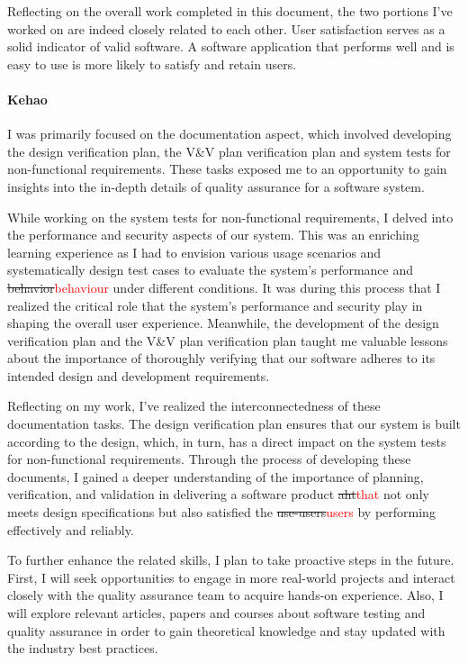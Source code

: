 \documentclass[12pt, titlepage]{article}
\newcommand{\rt}[1]{\textcolor{red}{#1}}
\begin{document}
Reflecting on the overall work completed in this document, the two portions I've
worked on are indeed closely related to each other. User satisfaction serves as
a solid indicator of valid software. A software application that performs well
and is easy to use is more likely to satisfy and retain users.

\paragraph*{Kehao}

I was primarily focused on the documentation aspect, which involved developing
the design verification plan, the V\&V plan verification plan and system tests
for non-functional requirements. These tasks exposed me to an opportunity to
gain insights into the in-depth details of quality assurance for a software
system.

While working on the system tests for non-functional requirements, I delved into
the performance and security aspects of our system. This was an enriching
learning experience as I had to envision various usage scenarios and
systematically design test cases to evaluate the system’s performance and
\sout{behavior}\rt{behaviour} under different conditions. It was during this process that I realized
the critical role that the system’s performance and security play in shaping the
overall user experience. Meanwhile, the development of the design verification
plan and the V\&V plan verification plan taught me valuable lessons about the
importance of thoroughly verifying that our software adheres to its intended
design and development requirements.

Reflecting on my work, I’ve realized the interconnectedness of these
documentation tasks. The design verification plan ensures that our system is
built according to the design, which, in turn, has a direct impact on the system
tests for non-functional requirements. Through the process of developing these
documents, I gained a deeper understanding of the importance of planning,
verification, and validation in delivering a software product \sout{aht}\rt{that} not only meets
design specifications but also satisfied the \sout{use-users}\rt{users} by performing effectively
and reliably.

To further enhance the related skills, I plan to take proactive steps in the
future. First, I will seek opportunities to engage in more real-world projects
and interact closely with the quality assurance team to acquire hands-on
experience. Also, I will explore relevant articles, papers and courses about
software testing and quality assurance in order to gain theoretical knowledge
and stay updated with the industry best practices.
\end{document}
